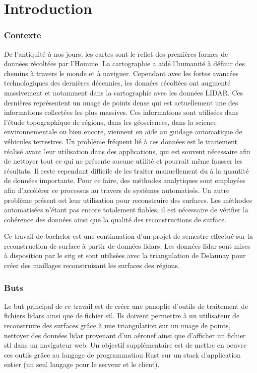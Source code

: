 \chapter{Introduction}
\subsection{Contexte}
De l'antiquité à nos jours, les cartes sont le reflet des premières formes de données récoltées par l'Homme.
La cartographie a aidé l'humanité à définir des chemins à travers le monde et à naviguer.
Cependant avec les fortes avancées technologiques des dernières décennies,
les données récoltées ont augmenté massivement et notamment dans la cartographie avec les données LIDAR.
Ces dernières représentent un nuage de points dense qui est actuellement une des informations collectées les plus massives.
Ces informations sont utilisées dans l'étude topographique de régions, dans les géosciences,
dans la science environnementale ou bien encore, viennent en aide au guidage automatique de véhicules terrestres.
Un problème fréquent lié à ces données est le traitement réalisé avant leur
utilisation dans des applications, qui est souvent nécessaire afin de nettoyer
tout ce qui ne présente aucune utilité et pourrait même fausser les résultats.
Il reste cependant difficile de les traiter manuellement du à la quantité de données importante.
Pour ce faire, des méthodes analytiques sont employées afin d'accélérer ce processus au travers de systèmes automatisés.
Un autre problème présent est leur utilisation pour reconstruire des surfaces.
Les méthodes automatisées n'étant pas encore totalement fiables, il est nécessaire de
vérifier la cohérence des données ainsi que la qualité des reconstructions de
surface.

Ce travail de bachelor est une continuation d'un projet de semestre effectué sur
la reconstruction de surface à partir de données lidars. Les données lidar sont mises à disposition par le \gls{sitg} et sont utilisées
avec la triangulation de Delaunay pour créer des maillages reconstruisant les
surfaces des régions.

\subsection{Buts}
Le but principal de ce travail est de créer une panoplie d'outils de traitement
de fichiers lidars ainsi que de fichier stl. Ils doivent permettre à un
utilisateur de reconstruire des surfaces grâce à une triangulation sur un nuage
de points, nettoyer des données lidar provenant d'un aéronef ainsi que
d'afficher un fichier stl dans un navigateur web. Un objectif supplémentaire est
de mettre en oeuvre ces outils grâce au langage de programmation Rust sur un
stack d'application entier (un seul langage pour le serveur et le client).

